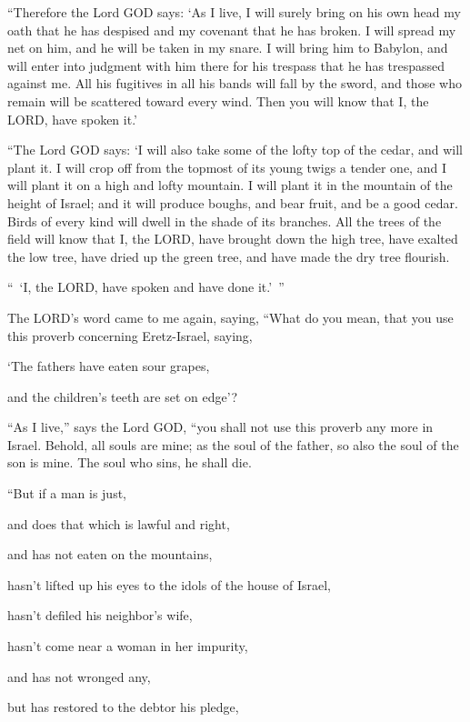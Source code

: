 \myverse{}“Therefore the Lord GOD says: ‘As I live, I will surely bring
on his own head my oath that he has despised and my covenant that he has broken.
\myverse{}I will spread my net on him, and he will be taken in my snare. I will bring
him to Babylon, and will enter into judgment with him there for his trespass that he has trespassed against
me.
\myverse{}All his fugitives in all his bands will fall by the sword, and those who
remain will be scattered toward every wind. Then you will know that I, the LORD, have spoken it.’

\myverse{}“The Lord GOD says: ‘I will also take some of the lofty top
of the cedar, and will plant it. I will crop off from the topmost of its young twigs a tender one, and
I will plant it on a high and lofty mountain.
\myverse{}I will plant it in the mountain of the height of Israel; and it will produce
boughs, and bear fruit, and be a good cedar. Birds of every kind will dwell in the shade of its branches.
\myverse{}All the trees of the field will know that I, the LORD, have brought down
the high tree, have exalted the low tree, have dried up the green tree, and have made the dry tree flourish.

“ ‘I, the LORD, have spoken and have done it.’ ”


\mychapter{} \myverse*{}The LORD’s word came to me again, saying,
\myverse{}“What do you mean, that you use this proverb concerning Eretz-Israel, saying,

‘The fathers have eaten sour grapes,

and the children’s teeth are set on edge’?

\myverse{}“As I live,” says the Lord GOD, “you shall not use this proverb
any more in Israel.
\myverse{}Behold, all souls are mine; as the soul of the father, so also the soul of
the son is mine. The soul who sins, he shall die.


\vspace{\baselineskip} \myverse{}“But if a man is just,

and does that which is lawful and right,

\myverse{}and has not eaten on the mountains,

hasn’t lifted up his eyes to the idols of the house of Israel,

hasn’t defiled his neighbor’s wife,

hasn’t come near a woman in her impurity,

\myverse{}and has not wronged any,

but has restored to the debtor his pledge,


